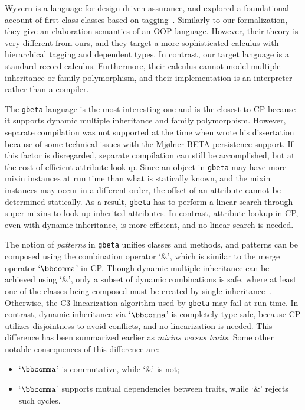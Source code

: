 Wyvern is a language for design-driven assurance, and \citet{lee2015theory}
explored a foundational account of first-class classes based on
tagging~\citep{glew1999type}. Similarly to our formalization, they give an
elaboration semantics of an OOP language. However, their theory is very
different from ours, and they target a more sophisticated calculus with
hierarchical tagging and dependent types. In contrast, our target language is a
standard record calculus. Furthermore, their calculus cannot model multiple
inheritance or family polymorphism, and their implementation is an interpreter
rather than a compiler.

The \texttt{gbeta} language is the most interesting one and is the closest to CP
because it supports dynamic multiple inheritance and family polymorphism.
However, separate compilation was not supported at the time when
\citet{ernst2000gbeta} wrote his dissertation because of some technical issues
with the Mjølner BETA persistence support. If this factor is disregarded,
separate compilation can still be accomplished, but at the cost of efficient
attribute lookup. Since an object in \texttt{gbeta} may have more mixin
instances at run time than what is statically known, and the mixin instances may
occur in a different order, the offset of an attribute cannot be determined
statically. As a result, \texttt{gbeta} has to perform a linear search through
super-mixins to look up inherited attributes. In contrast, attribute lookup in
CP, even with dynamic inheritance, is more efficient, and no linear search is
needed.

The notion of \emph{patterns} in \texttt{gbeta} unifies classes and methods, and
patterns can be composed using the combination operator `\&', which is similar
to the merge operator `$\bbcomma$' in CP. Though dynamic multiple inheritance
can be achieved using `\&', only a subset of dynamic combinations is safe, where
at least one of the classes being composed must be created by single
inheritance~\citep{ernst2002safe}. Otherwise, the C3 linearization algorithm
used by \texttt{gbeta} may fail at run time. In contrast, dynamic inheritance
via `$\bbcomma$' is completely type-safe, because CP utilizes disjointness to
avoid conflicts, and no linearization is needed. This difference has been
summarized earlier as \emph{mixins versus traits}. Some other notable
consequences of this difference are:
\begin{itemize}
\item `$\bbcomma$' is commutative, while `\&' is not;
\item `$\bbcomma$' supports mutual dependencies between traits, while `\&'
rejects such cycles.
\end{itemize}

